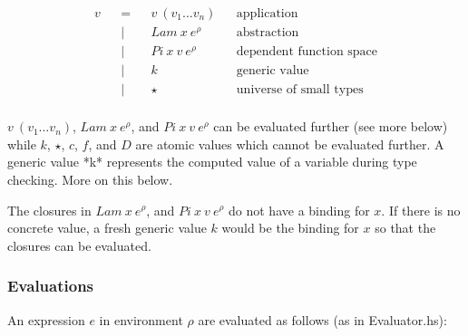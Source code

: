 \documentclass[acmsmall]{acmart}
\begin{document}
\begin{equation*}
  \begin{aligned}
    v &  & = &  & v \: (v_1 \dots v_n)     &  & \textrm{application}              \\
      &  & | &  & Lam \: x \: e^{\rho}     &  & \textrm{abstraction}              \\
      &  & | &  & Pi \: x \: v \: e^{\rho} &  & \textrm{dependent function space} \\
      &  & | &  & k                        &  & \textrm{generic value}            \\
      &  & | &  & \star                    &  & \textrm{universe of small types}  \\
  \end{aligned}
\end{equation*}

$v \: (v_1 \dots v_n)$, $Lam \: x \: e^{\rho}$, and $Pi \: x \: v \: e^{\rho}$
can be evaluated further (see more below) while $k$, $\star$, $c$, $f$, and $D$ are atomic values
which cannot be evaluated further. A generic value *k* represents the computed value of a variable during type
checking. More on this below.

The closures in $Lam \: x \: e^{\rho}$, and $Pi \: x \: v \: e^{\rho}$ do not have a
binding for $x$. If there is no concrete value, a fresh generic value $k$ would be
the binding for $x$ so that the closures can be evaluated.

\subsubsection{Evaluations}

An expression $e$ in environment $\rho$ are evaluated as follows (as in
Evaluator.hs):
\end{document}
